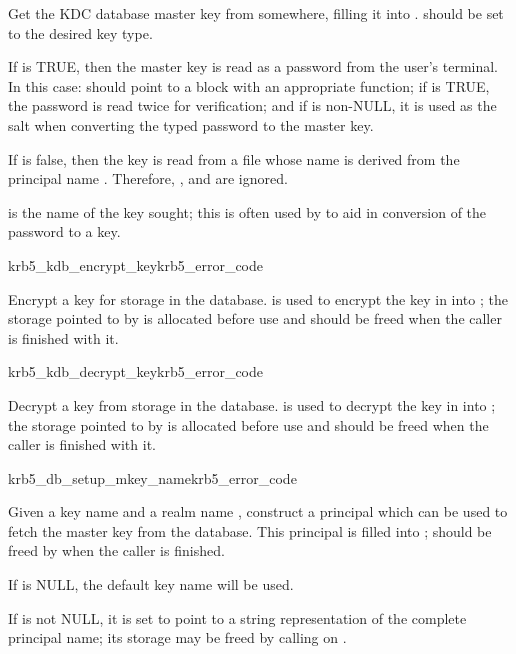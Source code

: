 Get the KDC database master key from somewhere, filling it into
. 
 should be set to the desired key type.

If  is TRUE, then the master key is read as a password
from the user's terminal.  In this case:
 should point to a block with an appropriate
 function; if  is TRUE, the
password is read twice for verification; and if  is
non-NULL, it is used as the salt when converting the typed
password to the master key.


If  is false, then the key is read from
a file whose name is derived from the principal name .
Therefore, ,  and 
are ignored.


 is the name of the key sought; this is often used by
 to aid in conversion of the password to a key. 

\begin{funcdecl}{krb5_kdb_encrypt_key}{krb5_error_code}{\funcin}
\funcinout
{}
\end{funcdecl}

Encrypt a key for storage in the database.   is used
to encrypt the key in  into ; the storage
pointed to by  is allocated before use and should be
freed when the caller is finished with it.

\begin{funcdecl}{krb5_kdb_decrypt_key}{krb5_error_code}{\funcin}
\funcinout
{}
\end{funcdecl}

Decrypt a key from storage in the database.   is used
to decrypt the key in  into ; the storage
pointed to by  is allocated before use and should be
freed when the caller is finished with it.

\begin{funcdecl}{krb5_db_setup_mkey_name}{krb5_error_code}{\funcin}
\funcout
{}
\end{funcdecl}

Given a key name  and a realm name ,
construct a principal which can be used to fetch the master key from the
database.  This principal is filled into ;
 should be freed by 
when the caller is finished.

If  is NULL, the default key name will be used.

If  is not NULL, it is set to point to a string
representation of the complete principal name; its storage may be freed
by calling  on .

